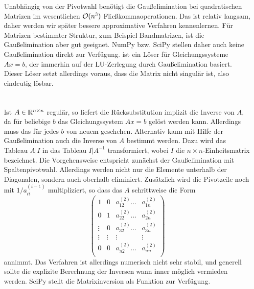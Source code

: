 Unabhängig von der Pivotwahl benötigt die Gaußelimination bei
quadratischen Matrizen im wesentlichen $\mathcal O(n^3)$
Fließkommaoperationen. Das ist relativ langsam, daher werden wir
später bessere approximative Verfahren kennenlernen. Für Matrizen
bestimmter Struktur, zum Beispiel Bandmatrizen, ist die
Gaußelimination aber gut geeignet. NumPy bzw. SciPy stellen daher auch
keine Gaußelimination direkt zur Verfügung.
 ist ein Löser für Gleichungssysteme
$Ax=b$, der immerhin auf der LU-Zerlegung durch Gaußelimination
basiert. Dieser Löser setzt allerdings voraus, dass die Matrix nicht
singulär ist, also eindeutig lösbar.
 
\section{}

Ist $A\in\mathbb{R}^{n\times n}$ regulär, so liefert die Rücksubstitution
implizit die Inverse von $A$, da für beliebige $b$ das
Gleichungssystem $Ax=b$ gelöst werden kann. Allerdings muss das für
jedes $b$ von neuem geschehen. Alternativ kann mit Hilfe der
Gaußelimination auch die Inverse von $A$ bestimmt werden. Dazu wird
das Tableau $A|I$ in das Tableau $I|A^{-1}$ transformiert, wobei $I$
die $n\times n$-Einheitsmatrix bezeichnet. Die Vorgehensweise
entspricht zunächst der Gaußelimination mit
Spaltenpivotwahl. Allerdings werden nicht nur die Elemente unterhalb
der Diagonalen, sondern auch oberhalb eliminiert. Zusätzlich wird die
Pivotzeile noch mit $1/a_{ii}^{(i-1)}$ multipliziert, so dass das $A$
schrittweise die Form
\begin{equation}
  \left(\begin{array}{cccc}
      1     & 0      & a_{12}^{(2)}\ldots &a_{1n}^{(2)} \\
      0     & 1      & a_{22}^{(2)}\ldots &a_{2n}^{(2)} \\
      \vdots& 0      & a_{32}^{(2)}\ldots &a_{3n}^{(2)} \\
      \vdots& \vdots & \vdots             & \vdots      \\
      0     & 0      & a_{n2}^{(2)}\ldots &a_{nn}^{(2)} \\
    \end{array}\right)
\end{equation}
annimmt. Das Verfahren ist allerdings numerisch nicht sehr stabil, und
generell sollte die explizite Berechnung der Inversen wann inner
möglich vermieden werden. SciPy stellt die Matrixinversion als
Funktion  zur Verfügung.

